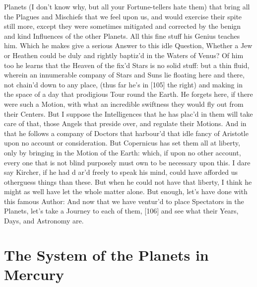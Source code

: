 \documentclass[letterpaper]{book}
\begin{document}
Planets (I don't know why, but all your Fortune-tellers hate them) that
bring all the Plagues and Mischiefs that we feel upon us, and would exercise
their spite still more, except they were sometimes mitigated and corrected
by the benign and kind Influences of the other Planets. All this fine stuff
his Genius teaches him. Which he makes give a serious Answer to this idle
Question, Whether a Jew or Heathen could be duly and rightly baptiz'd in the
Waters of Venus? Of him too he learns that the Heaven of the fix'd Stars is
no solid stuff: but a thin fluid, wherein an innumerable company of Stars
and Suns lie floating here and there, not chain'd down to any place, (thus
far he's in [105] the right) and making in the space of a day that
prodigious Tour round the Earth. He forgets here, if there were such a
Motion, with what an incredible swiftness they would fly out from their
Centers. But I suppose the Intelligences that he has plac'd in them will
take care of that, those Angels that preside over, and regulate their
Motions. And in that he follows a company of Doctors that harbour'd that
idle fancy of Aristotle upon no account or consideration. But Copernicus has
set them all at liberty, only by bringing in the Motion of the Earth: which,
if upon no other account, every one that is not blind purposely must own to
be necessary upon this. I dare say Kircher, if he had d ar'd freely to speak
his mind, could have afforded us otherguess things than these. But when he
could not have that liberty, I think he might as well have let the whole
matter alone. But enough, let's have done with this famous Author: And now
that we have ventur'd to place Spectators in the Planets, let's take a
Journey to each of them, [106] and see what their Years, Days, and Astronomy
are.


\section{The System of the Planets in Mercury}
\end{document}
